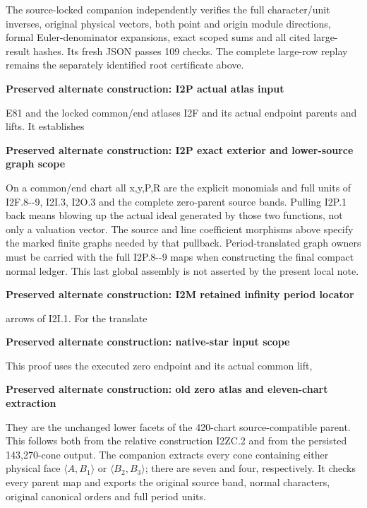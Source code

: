 The source-locked companion
independently verifies the full character/unit inverses,
original physical vectors, both point and origin module
directions, formal Euler-denominator expansions, exact
scoped sums and all cited large-result hashes. Its fresh
JSON passes 109 checks. The complete large-row replay
remains the separately identified root certificate above.






\par\bigskip\noindent\textbf{Preserved alternate construction: I2P actual atlas input}\par
E81 and the locked common/end atlases I2F and its actual endpoint parents and lifts. It establishes

\par\bigskip\noindent\textbf{Preserved alternate construction: I2P exact exterior and lower-source graph scope}\par
On a common/end chart all x,y,P,R are the explicit monomials and
full units of I2F.8-\/-9, I2I.3, I2O.3 and the complete zero-parent source bands. Pulling I2P.1 back
means blowing up the actual ideal generated by those two functions,
not only a valuation vector. The source and line coefficient
morphisms above specify the marked finite graphs needed by that
pullback. Period-translated graph owners must be carried with the
full I2P.8-\/-9 maps when constructing the final compact normal ledger.
This last global assembly is not asserted by the present local note.



\par\bigskip\noindent\textbf{Preserved alternate construction: I2M retained infinity period locator}\par
arrows of I2I.1. For the translate

\par\bigskip\noindent\textbf{Preserved alternate construction: native-star input scope}\par
This proof uses the executed zero endpoint and its actual common lift,

\par\bigskip\noindent\textbf{Preserved alternate construction: old zero atlas and eleven-chart extraction}\par
They are the unchanged lower facets of the 420-chart source-compatible
parent. This follows both from the relative construction I2ZC.2 and
from the persisted 143,270-cone output. The companion extracts every
cone containing either physical face \(\langle A,B_1\rangle\) or
\(\langle B_2,B_3\rangle\); there are seven and four, respectively.
It checks every parent map and exports the original source band,
normal characters, original canonical orders and full period units.



